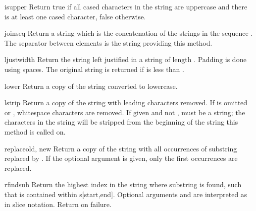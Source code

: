 \begin{methoddesc}[string]{isupper}{}
Return true if all cased characters in the string are uppercase and
there is at least one cased character, false otherwise.
\end{methoddesc}

\begin{methoddesc}[string]{join}{seq}
Return a string which is the concatenation of the strings in the
sequence .  The separator between elements is the string
providing this method.
\end{methoddesc}

\begin{methoddesc}[string]{ljust}{width}
Return the string left justified in a string of length .
Padding is done using spaces.  The original string is returned if
 is less than .
\end{methoddesc}

\begin{methoddesc}[string]{lower}{}
Return a copy of the string converted to lowercase.
\end{methoddesc}

\begin{methoddesc}[string]{lstrip}{}
Return a copy of the string with leading characters removed.  If
 is omitted or , whitespace characters are
removed.  If given and not ,  must be a string;
the characters in the string will be stripped from the beginning of
the string this method is called on.
\end{methoddesc}

\begin{methoddesc}[string]{replace}{old, new}
Return a copy of the string with all occurrences of substring
 replaced by .  If the optional argument
 is given, only the first  occurrences are
replaced.
\end{methoddesc}

\begin{methoddesc}[string]{rfind}{sub }
Return the highest index in the string where substring  is
found, such that  is contained within s[start,end].  Optional
arguments  and  are interpreted as in slice
notation.  Return  on failure.
\end{methoddesc}

